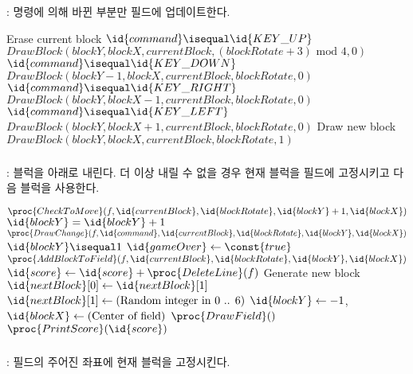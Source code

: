 \subsubsection{}: 명령에 의해 바뀐 부분만 필드에 업데이트한다.

\begin{codebox}
\li \Comment Erase current block
\li \If $\id{command} \isequal \id{KEY\_UP}$
\li \Then $DrawBlock(blockY, blockX, currentBlock, (blockRotate+3) \mbox{ mod } 4, 0)$ \End
\li \If $\id{command} \isequal \id{KEY\_DOWN}$
\li \Then $DrawBlock(blockY - 1, blockX, currentBlock, blockRotate, 0)$ \End
\li \If $\id{command} \isequal \id{KEY\_RIGHT}$
\li \Then $DrawBlock(blockY, blockX - 1, currentBlock, blockRotate, 0)$ \End
\li \If $\id{command} \isequal \id{KEY\_LEFT}$
\li \Then $DrawBlock(blockY, blockX + 1, currentBlock, blockRotate, 0)$ \End
\li \Comment Draw new block
\li $DrawBlock(blockY, blockX, currentBlock, blockRotate, 1)$
\end{codebox}

\subsubsection{}: 블럭을 아래로 내린다. 더 이상 내릴 수 없을 경우 현재 블럭을 필드에 고정시키고 다음 블럭을 사용한다.

\begin{codebox}
\li \If $\proc{CheckToMove}(f, \id{currentBlock}, \id{blockRotate}, \id{blockY} + 1, \id{blockX})$
\li \Then
        $\id{blockY} = \id{blockY} + 1$
\li     $\proc{DrawChange}(f, \id{command}, \id{currentBlock}, \id{blockRotate}, \id{blockY}, \id{blockX})$
\li \Else
\li     \If $\id{blockY} \isequal 1$
\li     \Then
            $\id{gameOver} \gets \const{true}$
\li     \Else
\li         $\proc{AddBlockToField}(f, \id{currentBlock}, \id{blockRotate}, \id{blockY}, \id{blockX})$
\li         $\id{score} \gets \id{score} + \proc{DeleteLine}(f)$
\li         \Comment Generate new block
\li         $\id{nextBlock}[0] \gets \id{nextBlock}[1]$
\li         $\id{nextBlock}[1] \gets (\mbox{Random integer in 0 .. 6})$
\li         $\id{blockY} \gets -1$, $\id{blockX} \gets (\mbox{Center of field})$
\li         $\proc{DrawField}()$
\li         $\proc{PrintScore}(\id{score})$
        \End
    \End
\end{codebox}

\subsubsection{}: 필드의 주어진 좌표에 현재 블럭을 고정시킨다.

